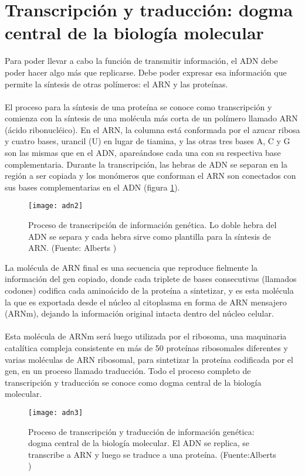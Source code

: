 \section{Transcripción y traducción: dogma central de la biología molecular}
Para poder llevar a cabo la función de transmitir información, el ADN debe poder hacer algo más que replicarse. Debe poder expresar esa información que permite la síntesis de otras polímeros: el ARN y las proteínas.\\\\
El proceso para la síntesis de una proteína se conoce como transcripción y comienza con la síntesis de una molécula más corta de un polímero llamado ARN (ácido ribonucléico). En el ARN, la columna está conformada por el azucar ribosa y cuatro bases, urancil (U) en lugar de tiamina, y las otras tres bases A, C y G son las mismas que en el ADN, apareándose cada una con su respectiva base complementaria. Durante la transcripción, las hebras de ADN se separan en la región a ser copiada y los monómeros que conforman el ARN son conectados con sus bases complementarias en el ADN (figura \ref{fig:adn2}).\\ 
\begin{figure}[h]
    \centering
    \texttt{[image: adn2]}
    \caption{Proceso de transcripción de información genética. Lo doble hebra del ADN se separa y cada hebra sirve como plantilla para la síntesis de ARN. (Fuente: Alberts \cite{Alberts2015})}
    \label{fig:adn2}
\end{figure}
La molécula de ARN final es una secuencia que reproduce fielmente la información del gen copiado, donde cada triplete de bases consecutivas (llamados codones) codifica cada aminoácido de la proteína a sintetizar, y es esta molécula la que es exportada desde el núcleo al citoplasma en forma de ARN mensajero (ARNm), dejando la información original intacta dentro del núcleo celular.\\\\
Esta molécula de ARNm será luego utilizada por el ribosoma, una maquinaria catalítica compleja consistente en más de 50 proteínas ribosomales diferentes y varias moléculas de ARN ribosomal, para sintetizar la proteína codificada por el gen, en un proceso llamado traducción. Todo el proceso completo de transcripción y traducción se conoce como dogma central de la biología molecular.
\begin{figure}[h]
    \centering
    \texttt{[image: adn3]}
    \caption{Proceso de transcripción y traducción de información genética: dogma central de la biología molecular. El ADN se replica, se transcribe a ARN y luego se traduce a una proteína. (Fuente:Alberts \cite{Alberts2015})}
    \label{fig:adn3}
\end{figure}
